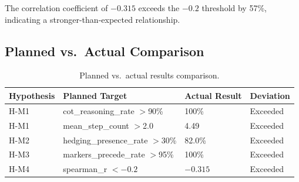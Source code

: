 The correlation coefficient of $-0.315$ exceeds the $-0.2$ threshold by 57\%, indicating a stronger-than-expected relationship.

\subsection{Planned vs.\ Actual Comparison}

\begin{table}[h]
\centering
\begin{tabular}{llll}
\toprule
Hypothesis & Planned Target & Actual Result & Deviation \\
\midrule
H-M1 & cot\_reasoning\_rate $>$90\% & 100\% & Exceeded \\
H-M1 & mean\_step\_count $>$2.0 & 4.49 & Exceeded \\
H-M2 & hedging\_presence\_rate $>$30\% & 82.0\% & Exceeded \\
H-M3 & markers\_precede\_rate $>$95\% & 100\% & Exceeded \\
H-M4 & spearman\_r $< -0.2$ & $-0.315$ & Exceeded \\
\bottomrule
\end{tabular}
\caption{Planned vs.\ actual results comparison.}
\label{tab:planned_vs_actual}
\end{table}
